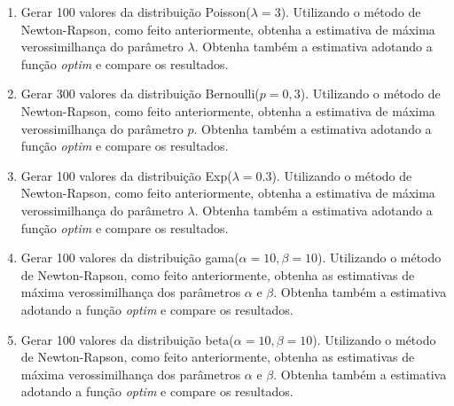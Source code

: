 \documentclass[
]{article}
\begin{document}
\begin{enumerate}
\def\labelenumi{(\arabic{enumi})}
\item
  Gerar 100 valores da distribuição Poisson(\(\lambda=3\)). Utilizando o
  método de Newton-Rapson, como feito anteriormente, obtenha a
  estimativa de máxima verossimilhança do parâmetro \(\lambda\). Obtenha
  também a estimativa adotando a função \emph{optim} e compare os
  resultados.
\item
  Gerar 300 valores da distribuição Bernoulli(\(p=0,3\)). Utilizando o
  método de Newton-Rapson, como feito anteriormente, obtenha a
  estimativa de máxima verossimilhança do parâmetro \(p\). Obtenha
  também a estimativa adotando a função \emph{optim} e compare os
  resultados.
\item
  Gerar 100 valores da distribuição Exp(\(\lambda=0.3\)). Utilizando o
  método de Newton-Rapson, como feito anteriormente, obtenha a
  estimativa de máxima verossimilhança do parâmetro \(\lambda\). Obtenha
  também a estimativa adotando a função \emph{optim} e compare os
  resultados.
\item
  Gerar 100 valores da distribuição gama(\(\alpha=10, \beta=10\)).
  Utilizando o método de Newton-Rapson, como feito anteriormente,
  obtenha as estimativas de máxima verossimilhança dos parâmetros
  \(\alpha\) e \(\beta\). Obtenha também a estimativa adotando a função
  \emph{optim} e compare os resultados.
\item
  Gerar 100 valores da distribuição beta(\(\alpha=10, \beta=10\)).
  Utilizando o método de Newton-Rapson, como feito anteriormente,
  obtenha as estimativas de máxima verossimilhança dos parâmetros
  \(\alpha\) e \(\beta\). Obtenha também a estimativa adotando a função
  \emph{optim} e compare os resultados.
\end{enumerate}
\end{document}
